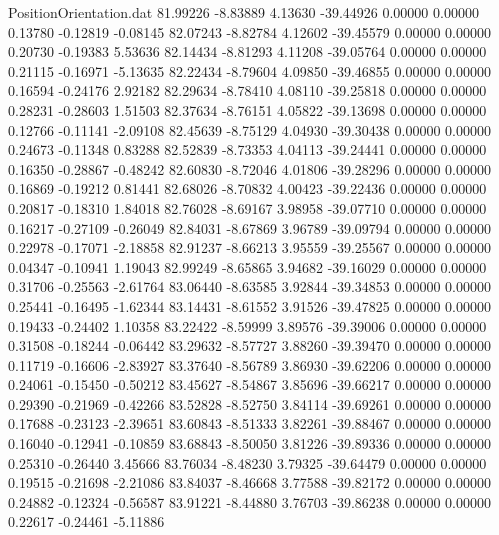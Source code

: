 \begin{filecontents}{PositionOrientation.dat}
  81.99226   -8.83889    4.13630   -39.44926    0.00000    0.00000    0.13780   -0.12819   -0.08145
  82.07243   -8.82784    4.12602   -39.45579    0.00000    0.00000    0.20730   -0.19383    5.53636
  82.14434   -8.81293    4.11208   -39.05764    0.00000    0.00000    0.21115   -0.16971   -5.13635
  82.22434   -8.79604    4.09850   -39.46855    0.00000    0.00000    0.16594   -0.24176    2.92182
  82.29634   -8.78410    4.08110   -39.25818    0.00000    0.00000    0.28231   -0.28603    1.51503
  82.37634   -8.76151    4.05822   -39.13698    0.00000    0.00000    0.12766   -0.11141   -2.09108
  82.45639   -8.75129    4.04930   -39.30438    0.00000    0.00000    0.24673   -0.11348    0.83288
  82.52839   -8.73353    4.04113   -39.24441    0.00000    0.00000    0.16350   -0.28867   -0.48242
  82.60830   -8.72046    4.01806   -39.28296    0.00000    0.00000    0.16869   -0.19212    0.81441
  82.68026   -8.70832    4.00423   -39.22436    0.00000    0.00000    0.20817   -0.18310    1.84018
  82.76028   -8.69167    3.98958   -39.07710    0.00000    0.00000    0.16217   -0.27109   -0.26049
  82.84031   -8.67869    3.96789   -39.09794    0.00000    0.00000    0.22978   -0.17071   -2.18858
  82.91237   -8.66213    3.95559   -39.25567    0.00000    0.00000    0.04347   -0.10941    1.19043
  82.99249   -8.65865    3.94682   -39.16029    0.00000    0.00000    0.31706   -0.25563   -2.61764
  83.06440   -8.63585    3.92844   -39.34853    0.00000    0.00000    0.25441   -0.16495   -1.62344
  83.14431   -8.61552    3.91526   -39.47825    0.00000    0.00000    0.19433   -0.24402    1.10358
  83.22422   -8.59999    3.89576   -39.39006    0.00000    0.00000    0.31508   -0.18244   -0.06442
  83.29632   -8.57727    3.88260   -39.39470    0.00000    0.00000    0.11719   -0.16606   -2.83927
  83.37640   -8.56789    3.86930   -39.62206    0.00000    0.00000    0.24061   -0.15450   -0.50212
  83.45627   -8.54867    3.85696   -39.66217    0.00000    0.00000    0.29390   -0.21969   -0.42266
  83.52828   -8.52750    3.84114   -39.69261    0.00000    0.00000    0.17688   -0.23123   -2.39651
  83.60843   -8.51333    3.82261   -39.88467    0.00000    0.00000    0.16040   -0.12941   -0.10859
  83.68843   -8.50050    3.81226   -39.89336    0.00000    0.00000    0.25310   -0.26440    3.45666
  83.76034   -8.48230    3.79325   -39.64479    0.00000    0.00000    0.19515   -0.21698   -2.21086
  83.84037   -8.46668    3.77588   -39.82172    0.00000    0.00000    0.24882   -0.12324   -0.56587
  83.91221   -8.44880    3.76703   -39.86238    0.00000    0.00000    0.22617   -0.24461   -5.11886

\end{filecontents}

